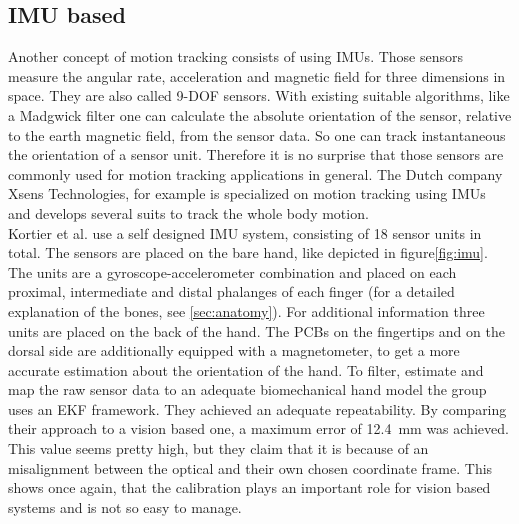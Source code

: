 \subsection{\acs{IMU} based} \label{subsec:approaches:IMU}
Another concept of motion tracking consists of using \acp{IMU}. Those sensors measure the angular rate, acceleration and magnetic field for three dimensions in space. They are also called 9-\ac{DOF} sensors. With existing suitable algorithms, like a Madgwick filter \cite{madgwick2010efficient} one can calculate the absolute orientation of the sensor, relative to the earth magnetic field, from the sensor data. So one can track instantaneous the orientation of a sensor unit. Therefore it is no surprise that those sensors are commonly used for motion tracking applications in general. The Dutch company Xsens Technologies, for example is specialized on motion tracking using \acp{IMU} and develops several suits to track the whole body motion.\\
Kortier et al. use a self designed \ac{IMU} system, consisting of 18 sensor units in total. The sensors are placed on the bare hand, like depicted in figure\ref{fig:imu}. The units are a gyroscope-accelerometer combination and placed on each proximal, intermediate and distal phalanges of each finger (for a detailed explanation of the bones, see \ref{sec:anatomy}). For additional information three units are placed on the back of the hand. The PCBs on the fingertips and on the dorsal side are additionally equipped with a magnetometer, to get a more accurate estimation about the orientation of the hand. To filter, estimate and map the raw sensor data to an adequate biomechanical hand model the group uses an \ac{EKF} framework. They achieved an adequate repeatability. By comparing their approach to a vision based one, a maximum error of \SI{12.4}{mm} was achieved. This value seems pretty high, but they claim that it is because of an misalignment between the optical and their own chosen coordinate frame. This shows once again, that the calibration plays an important role for vision based systems and is not so easy to manage.\\
